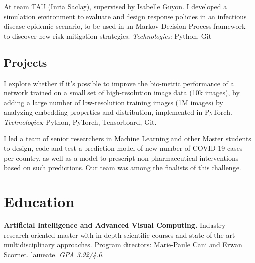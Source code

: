 \documentclass[11pt,a4paper,roman]{moderncv} %
\begin{document}
    {At team \href{https://www.inria.fr/en/tau}{TAU} (Inria Saclay), supervised by \href{https://guyon.chalearn.org/}{Isabelle Guyon}. I developed a simulation environment to evaluate and design response policies in an infectious disease epidemic scenario, to be used in an Markov Decision Process framework to discover new risk mitigation strategies. \textit{Technologies:} Python, Git.
    }
    

\subsection{Projects}

    {I explore whether if it's possible to improve the bio-metric performance of a network trained on a small set of high-resolution image data (10k images), by adding a large number of low-resolution training images (1M images) by analyzing embedding properties and distribution, implemented in PyTorch. \textit{Technologies:} Python, PyTorch, Tensorboard, Git.}
    
    {I led a team of senior researchers in Machine Learning and other Master students to design, code and test a prediction model of new number of COVID-19 cases per country, as well as a model to prescript non-pharmaceutical interventions based on such predictions. Our team was among the \href{https://www.xprize.org/challenge/pandemicresponse/articles/pandemic-response-challenge-finalists}{finalists} of this challenge.}
    
    

\section{Education}
    {\textbf{Artificial Intelligence and Advanced Visual Computing.} Industry research-oriented master with in-depth scientific courses and state-of-the-art multidisciplinary approaches. Program directors: \href{https://www.lix.polytechnique.fr/geovic/members/marie-paule_cani/}{Marie-Paule Cani} and \href{https://erwanscornet.github.io/}{Erwan Scornet}. \textit{} laureate. \textit{GPA 3.92/4.0}.}  
    
\end{document}
